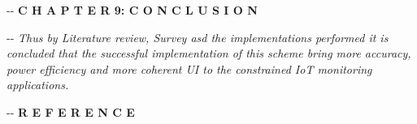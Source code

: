 \documentclass[12pt]{article}
\makeatletter
\newenvironment{indentation}[3]%
	{\par\setlength{\parindent}{#3}
	\setlength{\leftmargin}{#1}       \setlength{\rightmargin}{#2}%
	\advance\linewidth -\leftmargin       \advance\linewidth -\rightmargin%
	\advance\@totalleftmargin\leftmargin  \@setpar{{\@@par}}%
	\parshape 1\@totalleftmargin \linewidth\ignorespaces}{\par}%
\makeatother
\begin{document}
\newline
\pagebreak
\textbf{{\Large  }}
\begin{center}
\begin{indentation}{0pt}{0pt}{0pt}
\textbf{{\Large C H A P T E R 9: C O N C L U S I O N }}
\end{indentation}
\end{center}

\begin{indentation}{0pt}{0pt}{0pt}
\textit{{\large Thus by Literature review, Survey asd the implementations
performed it is concluded that the successful implementation of this scheme
bring more accuracy, power efficiency and more coherent UI to the constrained
IoT monitoring applications.}}
\end{indentation}
\pagebreak
\begin{center}
\begin{indentation}{0pt}{0pt}{0pt}
\textbf{{\Large R E F E R E N C E}}
\end{indentation}
\end{center}
\end{document}
